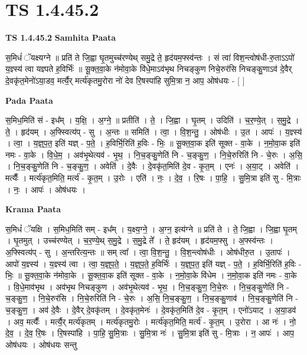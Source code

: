 \documentclass[17pt]{extarticle}
\begin{document}
\section*{ TS 1.4.45.2 }

\textbf{TS 1.4.45.2 } \newline
\textbf{Samhita Paata} \newline

स॒मिधं॑ ॅयक्ष्यग्ने ॥ प्रति॑ ते जि॒ह्वा घृ॒तमुच्च॑रण्येथ् समु॒द्रे ते॒ हृद॑यम॒फ्स्व॑न्तः । सं त्वा॑ विश॒न्त्वोष॑धी-रु॒ताऽऽपो॑ य॒ज्ञ्स्य॑ त्वा यज्ञ्पते ह॒विर्भिः॑ ॥ सू॒क्त॒वा॒के न॑मोवा॒के वि॑धे॒माऽव॑भृथ निचङ्कुण निचे॒रुर॑सि निचङ्कु॒णाऽव॑ दे॒वैर् दे॒वकृ॑त॒मेनो॑ऽया॒डव॒ मर्त्यै॒र् मर्त्य॑कृतमु॒रोरा नो॑ देव रि॒षस्पा॑हि सुमि॒त्रा न॒ आप॒ ओष॑धयः - [ ] \newline

\textbf{Pada Paata} \newline

स॒मिध॒मिति॑ सं - इध᳚म् । य॒क्षि॒ । अ॒ग्ने॒ ॥ प्रतीति॑ । ते॒ । जि॒ह्वा । घृ॒तम् । उदिति॑ । च॒र॒ण्ये॒त् । स॒मु॒द्रे । ते॒ । हृद॑यम् । अ॒फ्स्वित्य॑प् - सु । अ॒न्तः ॥ समिति॑ । त्वा॒ । वि॒श॒न्तु॒ । ओष॑धीः । उ॒त । आपः॑ । य॒ज्ञ्स्य॑ । त्वा॒ । य॒ज्ञ्॒प॒त॒ इति॑ यज्ञ् - प॒ते॒ । ह॒विर्भि॒रिति॑ ह॒विः - भिः॒ ॥ सू॒क्त॒वा॒क इति॑ सूक्त - वा॒के । न॒मो॒वा॒क इति॑ नमः - वा॒के । वि॒धे॒म॒ । अव॑भृ॒थेत्यव॑ - भृ॒थ॒ । नि॒च॒ङ्कु॒णेति॑ नि - च॒ङ्कु॒ण॒ । नि॒चे॒रुरिति॑ नि - चे॒रुः । अ॒सि॒ । नि॒च॒ङ्कु॒णेति॑ नि - च॒ङ्कु॒ण॒ । अवेति॑ । दे॒वैः । दे॒वकृ॑त॒मिति॑ दे॒व - कृ॒त॒म् । एनः॑ । अ॒या॒ट् । अवेति॑ । मर्त्यैः᳚ । मर्त्य॑कृत॒मिति॒ मर्त्य॑ - कृ॒त॒म् । उ॒रोः । एति॑ । नः॒ । दे॒व॒ । रि॒षः । पा॒हि॒ । सु॒मि॒त्रा इति॑ सु - मि॒त्राः । नः॒ । आपः॑ । ओष॑धयः ।  \newline


\textbf{Krama Paata} \newline

स॒मिधं॑ ॅयक्षि । स॒मिध॒मिति॑ सम् - इध᳚म् । य॒क्ष्य॒ग्ने॒ । अ॒ग्न॒ इत्य॑ग्ने ॥ प्रति॑ ते । ते॒ जि॒ह्वा । जि॒ह्वा घृ॒तम् । घृ॒तमुत् । उच्च॑रण्येत् । च॒र॒ण्ये॒थ् स॒मु॒द्रे । स॒मु॒द्रे ते᳚ । ते॒ हृद॑यम् । हृद॑यम॒फ्सु । अ॒फ्स्व॑न्तः । अ॒फ्स्वित्य॑प् - सु । अ॒न्तरित्य॒न्तः ॥ सम् त्वा᳚ । त्वा॒ वि॒श॒न्तु॒ । वि॒श॒न्त्वोष॑धीः । ओष॑धीरु॒त । उ॒तापः॑ । आपो॑ य॒ज्ञ्स्य॑ । य॒ज्ञ्स्य॑ त्वा । त्वा॒ य॒ज्ञ्॒प॒ते॒ । य॒ज्ञ्॒प॒ते॒ ह॒विर्भिः॑ । य॒ज्ञ्॒प॒त॒ इति॑ यज्ञ् - प॒ते॒ । ह॒विर्भि॒रिति॑ ह॒विः - भिः॒ ॥ सू॒क्त॒वा॒के न॑मोवा॒के । सू॒क्त॒वा॒क इति॑ सूक्त - वा॒के । न॒मो॒वा॒के वि॑धेम । न॒मो॒वा॒क इति॑ नमः - वा॒के । वि॒धे॒माव॑भृथ । अव॑भृथ निचङ्कुण । अव॑भृ॒थेत्यव॑ - भृ॒थ॒ । नि॒च॒ङ्कु॒ण॒ नि॒चे॒रुः । नि॒च॒ङ्कु॒णेति॑ नि - च॒ङ्कु॒ण॒ । नि॒चे॒रुर॑सि । नि॒चे॒रुरिति॑ नि - चे॒रुः । अ॒सि॒ नि॒च॒ङ्कु॒ण॒ । नि॒च॒ङ्कु॒णाव॑ । नि॒च॒ङ्कु॒णेति॑ नि - च॒ङ्कु॒ण॒ । अव॑ दे॒वैः । दे॒वैर् दे॒वकृ॑तम् । दे॒वकृ॑त॒मेनः॑ । दे॒वकृ॑त॒मिति॑ दे॒व - कृ॒त॒म् । एनो॑ऽयाट् । अ॒या॒डव॑ । अव॒ मर्त्यैः᳚ । मर्त्यै॒र् मर्त्य॑कृतम् । मर्त्य॑कृतमु॒रोः । मर्त्य॑कृत॒मिति॒ मर्त्य॑ - कृ॒त॒म् । उ॒रोरा । आ नः॑ । नो॒ दे॒व॒ । दे॒व॒ रि॒षः । रि॒षस्पा॑हि । पा॒हि॒ सु॒मि॒त्राः । सु॒मि॒त्रा नः॑ । सु॒मि॒त्रा इति॑ सु - मि॒त्राः । न॒ आपः॑ । आप॒ ओष॑धयः । ओष॑धयः सन्तु \newline
\end{document}
